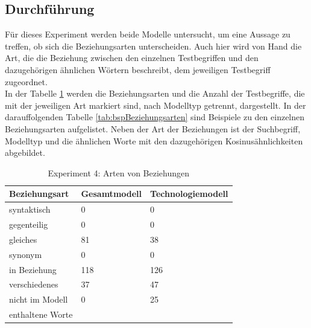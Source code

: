 \documentclass[12pt,a4paper]{report}
\begin{document}
		\subsection*{Durchführung}
		Für dieses Experiment werden beide Modelle untersucht, um eine Aussage zu treffen, ob sich die Beziehungsarten unterscheiden. Auch hier wird von Hand die Art, die die Beziehung zwischen den einzelnen Testbegriffen und den dazugehörigen ähnlichen Wörtern beschreibt, dem jeweiligen Testbegriff zugeordnet. \\
		In der Tabelle \ref{tab:experiment4} werden die Beziehungsarten und die Anzahl der Testbegriffe, die mit der jeweiligen Art markiert sind, nach Modelltyp getrennt, dargestellt. In der darauffolgenden Tabelle \ref{tab:bspBeziehungsarten} sind Beispiele zu den einzelnen Beziehungsarten aufgelistet. Neben der Art der Beziehungen ist der Suchbegriff, Modelltyp und die ähnlichen Worte mit den dazugehörigen Kosinusähnlichkeiten abgebildet.\\
		
		
		
\begin{table}[H]
\caption{Experiment 4: Arten von Beziehungen}
\label{tab:experiment4}
\begin{center}
\begin{tabular}{|l||l|l|}
\hline
\textbf{Beziehungsart}	& \textbf{Gesamtmodell}	&   \textbf{Technologiemodell}   \\

\hline
 syntaktisch & 0 	& 0 \\
 \hline
 gegenteilig & 0 	& 0  \\
 \hline
 gleiches & 81 	& 38  \\
 \hline
 synonym & 0 	& 0  \\
 \hline
 in Beziehung & 118 	& 126 \\
 \hline
 verschiedenes & 37	& 47 \\
 \hline
 nicht im Modell & 0  & 25  \\
 enthaltene Worte &   &\\
 \hline
 
\end{tabular}
\end{center}
\end{table}
		
		
\end{document}
